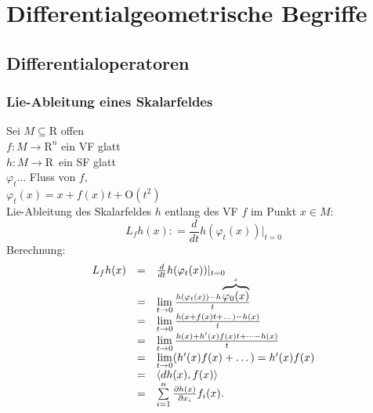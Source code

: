 \documentclass[ngerman]{tudscrreprt}
\begin{document}
\chapter{Differentialgeometrische Begriffe}
\section{Differentialoperatoren}
\subsection{Lie-Ableitung eines Skalarfeldes}
Sei $M \subseteq \mathrm{R}$ offen\\ 
$f: M\to \mathrm{R}^n$ ein VF glatt\\ 
$h: M\to \mathrm{R}$ \,ein SF glatt\\ 
$\varphi_t \dots $ Fluss von $f$,\\ 
$\varphi_t(x) = x + f(x)t + \mathrm{O}(t^2)$\\ 
Lie-Ableitung des Skalarfeldes $h$ entlang des VF $f$ im Punkt $x \in M:$ 
\begin{equation*}
L_f h(x): = \frac{d}{dt} h(\varphi_t(x))|_{t=0}
\end{equation*} 
Berechnung: 
\begin{equation*}
\begin{array}{l l l}
L_f h(x) &=& \frac{d}{dt}h (\varphi_t(x))|_{t=0}\\ 
&=& \lim\limits_{t\to 0} \frac{h(\varphi_t(x)) - h\overbrace{\varphi_0(x)}^{x} }{t}\\ 
&=& \lim\limits_{t\to 0} \frac{ h(x+ f(x)t +\dots  ) - h(x) }{t}\\ 
&=&\lim\limits_{t\to 0} \frac{h(x) + h'(x) f(x)t + \dots - h(x) }{t}\\ 
&=& \lim\limits_{t\to 0} (h'(x) f(x) + \dots ) = h'(x) f(x) \\ 
&=& \langle dh(x), f(x) \rangle \\ 
&=& \sum\limits_{i=1}^{n} \frac{\partial h(x)}{\partial x_i} f_i(x).
\end{array}
\end{equation*}
\end{document}
